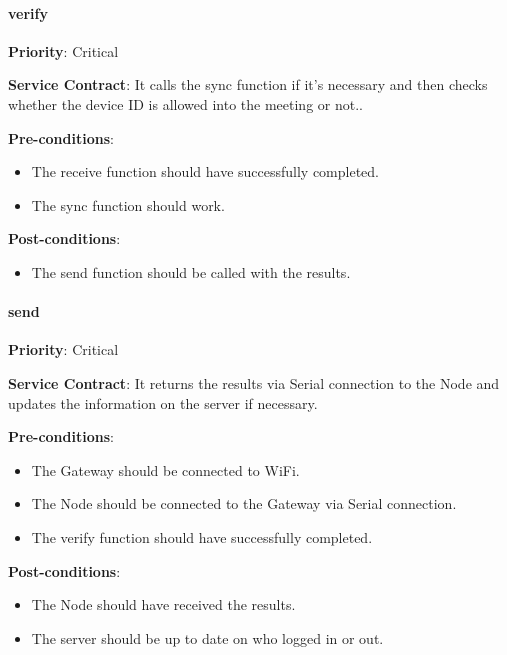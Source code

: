 		\paragraph{verify}
			\begin{description}
			    \item{\textbf{Priority}:} Critical%
			    \item{\textbf{Service Contract}:} It calls the sync function if it's necessary and then checks whether the device ID is allowed into the meeting or not..%
			    \item{\textbf{Pre-conditions}:}%
    			    \begin{itemize}
    			        \item The receive function should have successfully completed.
    			        \item The sync function should work.
    			    \end{itemize}
			    \item{\textbf{Post-conditions}:} %
    			    \begin{itemize}
    			        \item The send function should be called with the results.
    			    \end{itemize}
			\end{description}
			
		\paragraph{send}
			\begin{description}
			    \item{\textbf{Priority}:} Critical%
			    \item{\textbf{Service Contract}:} It returns the results via Serial connection to the Node and updates the information on the server if necessary.%
			    \item{\textbf{Pre-conditions}:}%
    			    \begin{itemize}
    			        \item The Gateway should be connected to WiFi.
    			        \item The Node should be connected to the Gateway via Serial connection.
    			        \item The verify function should have successfully completed.
    			    \end{itemize}
			    \item{\textbf{Post-conditions}:} %
    			    \begin{itemize}
    			        \item The Node should have received the results.
    			        \item The server should be up to date on who logged in or out.
    			    \end{itemize}
			\end{description}